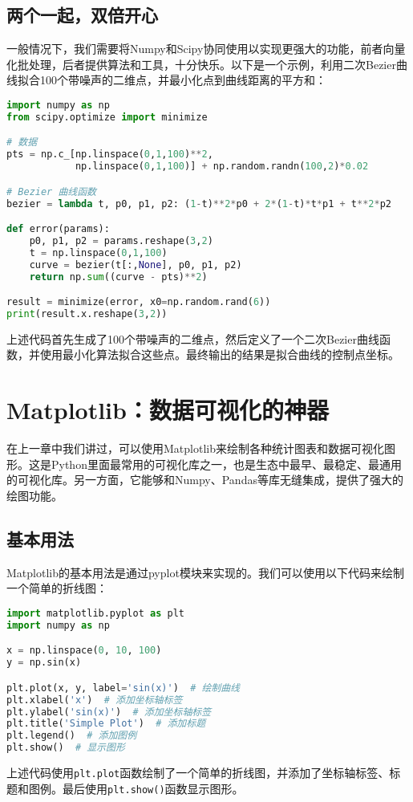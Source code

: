 \documentclass[../main.tex]{subfiles}
\begin{document}
\subsection{两个一起，双倍开心}

一般情况下，我们需要将Numpy和Scipy协同使用以实现更强大的功能，前者向量化批处理，后者提供算法和工具，十分快乐。以下是一个示例，利用二次Bezier曲线拟合100个带噪声的二维点，并最小化点到曲线距离的平方和：
\begin{lstlisting}[language=python]
import numpy as np
from scipy.optimize import minimize

# 数据
pts = np.c_[np.linspace(0,1,100)**2,
            np.linspace(0,1,100)] + np.random.randn(100,2)*0.02

# Bezier 曲线函数
bezier = lambda t, p0, p1, p2: (1-t)**2*p0 + 2*(1-t)*t*p1 + t**2*p2

def error(params):
    p0, p1, p2 = params.reshape(3,2)
    t = np.linspace(0,1,100)
    curve = bezier(t[:,None], p0, p1, p2)
    return np.sum((curve - pts)**2)

result = minimize(error, x0=np.random.rand(6))
print(result.x.reshape(3,2))
\end{lstlisting}
上述代码首先生成了100个带噪声的二维点，然后定义了一个二次Bezier曲线函数，并使用最小化算法拟合这些点。最终输出的结果是拟合曲线的控制点坐标。

\section{Matplotlib：数据可视化的神器}

在上一章中我们讲过，可以使用Matplotlib来绘制各种统计图表和数据可视化图形。这是Python里面最常用的可视化库之一，也是生态中最早、最稳定、最通用的可视化库。另一方面，它能够和Numpy、Pandas等库无缝集成，提供了强大的绘图功能。

\subsection{基本用法}

Matplotlib的基本用法是通过pyplot模块来实现的。我们可以使用以下代码来绘制一个简单的折线图：
\begin{lstlisting}[language=python]
import matplotlib.pyplot as plt
import numpy as np

x = np.linspace(0, 10, 100)
y = np.sin(x)

plt.plot(x, y, label='sin(x)')  # 绘制曲线
plt.xlabel('x')  # 添加坐标轴标签
plt.ylabel('sin(x)')  # 添加坐标轴标签
plt.title('Simple Plot')  # 添加标题
plt.legend()  # 添加图例
plt.show()  # 显示图形
\end{lstlisting}
上述代码使用\texttt{plt.plot}函数绘制了一个简单的折线图，并添加了坐标轴标签、标题和图例。最后使用\texttt{plt.show()}函数显示图形。
\end{document}
